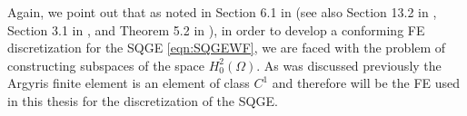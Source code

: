Again, we point out that as noted in Section 6.1 in \cite{Ciarlet} (see also
Section 13.2 in \cite{Gunzburger89}, Section 3.1 in \cite{Johnson}, and Theorem
5.2 in \cite{Braess}), in order to develop a conforming FE discretization for the
SQGE \eqref{eqn:SQGEWF}, we are faced with the problem of constructing subspaces
of the space $H^2_0(\Omega)$.  As was discussed previously the Argyris finite
element is an element of class $C^1$ and therefore will be the FE used in this
thesis for the discretization of the SQGE.

